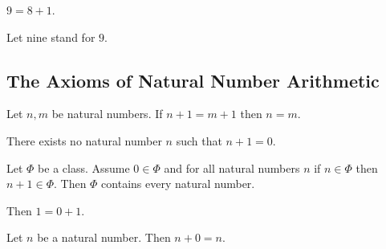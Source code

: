 \documentclass[10pt]{article}
\begin{document}
  \begin{forthel}
    \begin{definition}[id=ARITHMETIC_01_7371844250238976,printid]
      $9 = 8 + 1$.
    \end{definition}

    Let nine stand for $9$.
  \end{forthel}


  \subsection*{The Axioms of Natural Number Arithmetic}

  \begin{forthel}
    \begin{axiom}[id=ARITHMETIC_01_3604163883696128,printid]
      Let $n, m$ be natural numbers.
      If $n + 1 = m + 1$ then $n = m$.
    \end{axiom}
  \end{forthel}

  \begin{forthel}
    \begin{axiom}[id=ARITHMETIC_01_4454289938317312,printid]
      There exists no natural number $n$ such that $n + 1 = 0$.
    \end{axiom}
  \end{forthel}

  \begin{forthel}
    \begin{axiom}[title=Induction,id=ARITHMETIC_01_4764664342773760,printid]
      Let $\Phi$ be a class.
      Assume $0 \in \Phi$ and for all natural numbers $n$ if $n \in \Phi$ then
      $n + 1 \in \Phi$.
      Then $\Phi$ contains every natural number.
    \end{axiom}
  \end{forthel}

  \begin{forthel}
    \begin{axiom}[id=ARITHMETIC_03_5962332515874540,printid]
      Then $1 = 0 + 1$.
    \end{axiom}
  \end{forthel}

  \begin{forthel}
    \begin{axiom}[id=ARITHMETIC_03_4827955356237824,printid]
      Let $n$ be a natural number.
      Then $n + 0 = n$.
    \end{axiom}
  \end{forthel}
\end{document}
